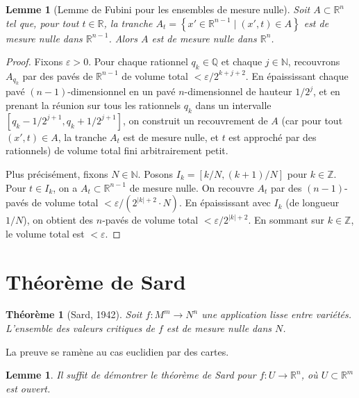 \documentclass[12pt,a4paper,openany]{book}
\theoremstyle{definition}
\theoremstyle{plain}
\newtheorem{theoreme}[definition]{Théorème}
\newtheorem{lemme}[definition]{Lemme}
\theoremstyle{remark}
\newcommand{\N}{\mathbb{N}}
\newcommand{\Z}{\mathbb{Z}}
\newcommand{\Q}{\mathbb{Q}}
\newcommand{\R}{\mathbb{R}}
\newcommand{\abs}[1]{\left|#1\right|}
\newcommand{\set}[1]{\left\{#1\right\}}
\begin{document}
\begin{lemme}[Lemme de Fubini pour les ensembles de mesure nulle]\label{lem:fubini-mesure}
Soit $A \subset \R^n$ tel que, pour tout $t \in \R$, la \emph{tranche}
$A_t = \set{x' \in \R^{n-1} \mid (x', t) \in A}$ est de mesure nulle dans
$\R^{n-1}$. Alors $A$ est de mesure nulle dans $\R^n$.
\end{lemme}

\begin{proof}
Fixons $\varepsilon > 0$. Pour chaque rationnel $q_k \in \Q$ et chaque
$j \in \N$, recouvrons $A_{q_k}$ par des pavés de $\R^{n-1}$ de volume total
$< \varepsilon / 2^{k+j+2}$. En épaississant chaque pavé $(n{-}1)$-dimensionnel
en un pavé $n$-dimensionnel de hauteur $1/2^j$, et en prenant la réunion sur
tous les rationnels $q_k$ dans un intervalle $[q_k - 1/2^{j+1}, q_k + 1/2^{j+1}]$,
on construit un recouvrement de $A$ (car pour tout $(x', t) \in A$, la tranche
$A_t$ est de mesure nulle, et $t$ est approché par des rationnels) de volume
total fini arbitrairement petit.

Plus précisément, fixons $N \in \N$. Posons $I_k = [k/N, (k+1)/N]$ pour
$k \in \Z$. Pour $t \in I_k$, on a $A_t \subset \R^{n-1}$ de mesure nulle.
On recouvre $A_t$ par des $(n{-}1)$-pavés de volume total $< \varepsilon/(2^{\abs{k}+2} \cdot N)$.
En épaississant avec $I_k$ (de longueur $1/N$), on obtient des $n$-pavés
de volume total $< \varepsilon/2^{\abs{k}+2}$. En sommant sur $k \in \Z$,
le volume total est $< \varepsilon$.
\end{proof}

\section{Théorème de Sard}\label{sec:sard}

\begin{theoreme}[Sard, 1942]\label{thm:sard}
Soit $f \colon M^m \to N^n$ une application lisse entre variétés. L'ensemble
des valeurs critiques de $f$ est de mesure nulle dans $N$.
\end{theoreme}

La preuve se ramène au cas euclidien par des cartes.

\begin{lemme}\label{lem:sard-local}
Il suffit de démontrer le théorème de Sard pour $f \colon U \to \R^n$, où
$U \subset \R^m$ est ouvert.
\end{lemme}
\end{document}
